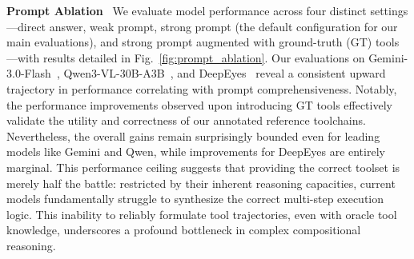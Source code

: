 \documentclass[runningheads]{llncs}
\begin{document}
\noindent \textbf{Prompt Ablation}~\label{sec:ablation_study}
We evaluate model performance across four distinct settings—direct answer, weak prompt, strong prompt (the default configuration for our main evaluations), and strong prompt augmented with ground-truth (GT) tools—with results detailed in Fig.~\ref{fig:prompt_ablation}. Our evaluations on Gemini-3.0-Flash~\cite{google2025gemini3flash}, Qwen3-VL-30B-A3B~\cite{qwen3-vl}, and DeepEyes~\cite{zheng2025deepeyes} reveal a consistent upward trajectory in performance correlating with prompt comprehensiveness. Notably, the performance improvements observed upon introducing GT tools effectively validate the utility and correctness of our annotated reference toolchains. Nevertheless, the overall gains remain surprisingly bounded even for leading models like Gemini and Qwen, while improvements for DeepEyes are entirely marginal. This performance ceiling suggests that providing the correct toolset is merely half the battle: restricted by their inherent reasoning capacities, current models fundamentally struggle to synthesize the correct multi-step execution logic. This inability to reliably formulate tool trajectories, even with oracle tool knowledge, underscores a profound bottleneck in complex compositional reasoning.
\end{document}
